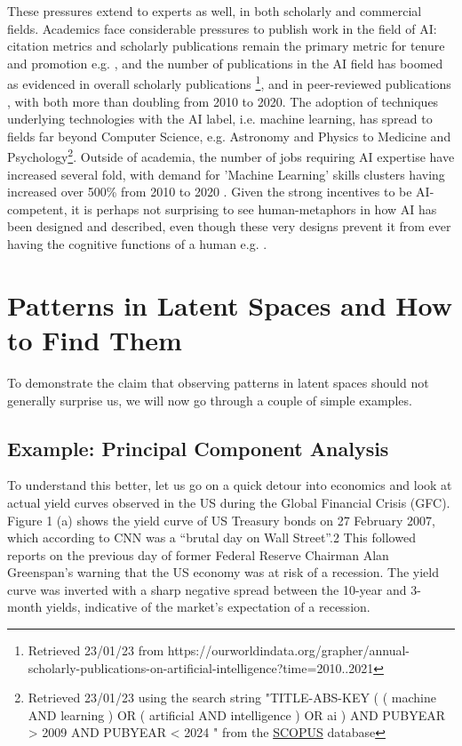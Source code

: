 \documentclass{article}
\theoremstyle{plain}
\theoremstyle{definition}
\theoremstyle{remark}
\begin{document}
These pressures extend to experts as well, in both scholarly and commercial fields. Academics face considerable pressures to publish work in the field of AI: citation metrics and scholarly publications remain the primary metric for tenure and promotion e.g. \cite{alperin2019significant}, and the number of publications in the AI field has boomed as evidenced in overall scholarly publications \footnote{ Retrieved 23/01/23 from https://ourworldindata.org/grapher/annual-scholarly-publications-on-artificial-intelligence?time=2010..2021 }, and in peer-reviewed publications \cite{Maslej2023-pi}, with both more than doubling from 2010 to 2020. The adoption of techniques underlying technologies with the AI label, i.e. machine learning, has spread to fields far beyond Computer Science, e.g. Astronomy and Physics to Medicine and Psychology\footnote{Retrieved 23/01/23 using the search string "TITLE-ABS-KEY ( ( machine  AND  learning )  OR  ( artificial  AND  intelligence )  OR  ai )  AND  PUBYEAR  >  2009  AND  PUBYEAR  <  2024 " from the \href{https://www.scopus.com/}{SCOPUS} database}. Outside of academia, the number of jobs requiring AI expertise have increased several fold, with demand for 'Machine Learning' skills clusters having increased over 500\% from 2010 to 2020 \cite{Maslej2023-pi}. Given the strong incentives to be AI-competent, it is perhaps not surprising to see human-metaphors in how AI has been designed and described, even though these very designs prevent it from ever having the cognitive functions of a human e.g. \cite{salles2020anthropomorphism, van2023reclaiming}. 

\section{Patterns in Latent Spaces and How to Find Them}

To demonstrate the claim that observing patterns in latent spaces should not generally surprise us, we will now go through a couple of simple examples.

\subsection{Example: Principal Component Analysis}

To understand this better, let us go on a quick detour into economics and look at actual yield curves observed in the US during the Global Financial Crisis (GFC). Figure 1 (a) shows the yield curve of US Treasury bonds on 27 February 2007, which according to CNN was a “brutal day on Wall Street”.2 This followed reports on the previous day of former Federal Reserve Chairman Alan Greenspan’s warning that the US economy was at risk of a recession. The yield curve was inverted with a sharp negative spread between the 10-year and 3-month yields, indicative of the market’s expectation of a recession.
\end{document}
